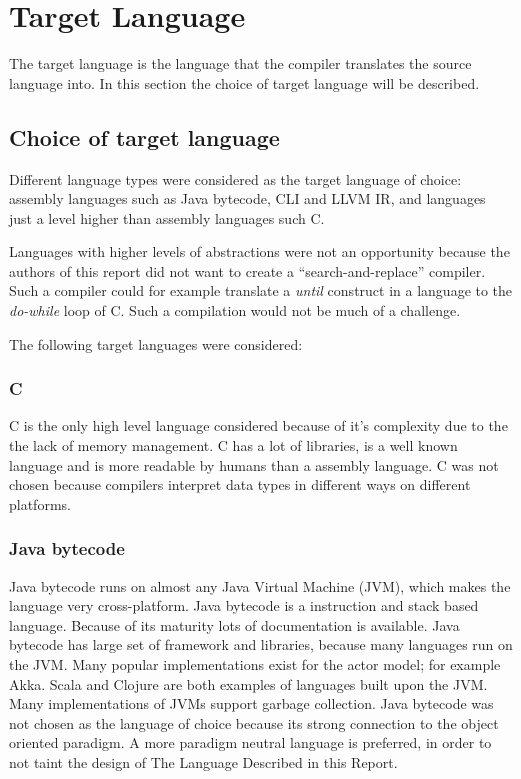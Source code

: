 \section{Target Language}
\label{sec:targetLanguage}

The target language is the language that the compiler translates the source language into. In this section the choice of target language will be described.

\subsection{Choice of target language}

Different language types were considered as the target language of choice: assembly languages such as Java bytecode, CLI and LLVM IR, and languages just a level higher than assembly languages such C.

Languages with higher levels of abstractions were not an opportunity because the authors of this report did not want to create a \enquote{search-and-replace} compiler. Such a compiler could for example translate a \emph{until} construct in a language to the \emph{do-while} loop of C. Such a compilation would not be much of a challenge.

The following target languages were considered:

\subsubsection{C}
C is the only high level language considered because of it's complexity due to the the lack of memory management. C has a lot of libraries, is a well known language and is more readable by humans than a assembly language. C was not chosen because compilers interpret data types in different ways on different platforms.

\subsubsection{Java bytecode}
Java bytecode runs on almost any Java Virtual Machine (JVM), which makes the language very cross-platform. Java bytecode is a instruction and stack based language. Because of its maturity lots of documentation is available. Java bytecode has large set of framework and libraries, because many languages run on the JVM. Many popular implementations exist for the actor model; for example Akka. Scala and Clojure are both examples of languages built upon the JVM. Many implementations of JVMs support garbage collection. Java bytecode was not chosen as the language of choice because its strong connection to the object oriented paradigm. A more paradigm neutral language is preferred, in order to not taint the design of The Language Described in this Report.

